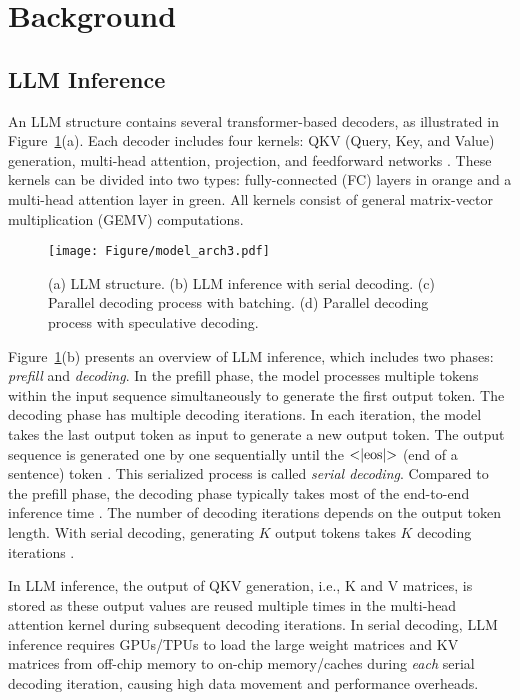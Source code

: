 \section{Background}




\subsection{LLM Inference}



An LLM structure contains several transformer-based decoders, as illustrated in Figure~\ref{fig:parallel_decoding}(a). Each decoder includes four kernels: QKV (Query, Key, and Value) generation, multi-head attention, projection, and feedforward networks \cite{vaswani2017attention}. These kernels can be divided into two types: fully-connected (FC) layers in orange and a multi-head attention layer in green. All kernels consist of general matrix-vector multiplication (GEMV) computations.

\begin{figure}[h!]
\centering
\texttt{[image: Figure/model\_arch3.pdf]}
\caption{(a) LLM structure. (b) LLM inference with serial decoding. (c) Parallel decoding process with batching. (d) Parallel decoding process with speculative decoding.}
\label{fig:parallel_decoding}
\end{figure}

Figure~\ref{fig:parallel_decoding}(b) presents an overview of LLM inference, which includes two phases: \emph{prefill} and \emph{decoding}. In the prefill phase, the model processes multiple tokens within the input sequence simultaneously to generate the first output token. The decoding phase has multiple decoding iterations. In each iteration, the model takes the last output token as input to generate a new output token. The output sequence is generated one by one sequentially until the $\text{\textless|eos|\textgreater}$ (end of a sentence) token \cite{vaswani2017attention}. This serialized process is called \emph{serial decoding}. Compared to the prefill phase, the decoding phase typically takes most of the end-to-end inference time \cite{zhang2023draft}. The number of decoding iterations depends on the output token length. With serial decoding, generating $K$ output tokens takes $K$ decoding iterations \cite{leviathan2023fast}. 




In LLM inference, the output of QKV generation, i.e., K and V matrices, is stored as these output values are reused multiple times in the multi-head attention kernel during subsequent decoding iterations. In serial decoding, LLM inference requires GPUs/TPUs to load the large weight matrices and KV matrices from off-chip memory to on-chip memory/caches during \emph{each} serial decoding iteration, causing high data movement and performance overheads.




